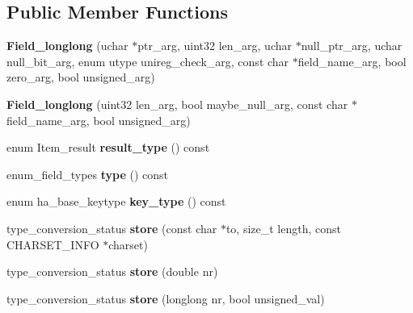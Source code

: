 \subsection*{Public Member Functions}
\begin{DoxyCompactItemize}
\item 
\mbox{\label{classField__longlong_a8f50277e28ab8d4a9904d38f58b73a9b}} 
{\bfseries Field\+\_\+longlong} (uchar $\ast$ptr\+\_\+arg, uint32 len\+\_\+arg, uchar $\ast$null\+\_\+ptr\+\_\+arg, uchar null\+\_\+bit\+\_\+arg, enum utype unireg\+\_\+check\+\_\+arg, const char $\ast$field\+\_\+name\+\_\+arg, bool zero\+\_\+arg, bool unsigned\+\_\+arg)
\item 
\mbox{\label{classField__longlong_a53178bd4230b8352350d18a0248507d1}} 
{\bfseries Field\+\_\+longlong} (uint32 len\+\_\+arg, bool maybe\+\_\+null\+\_\+arg, const char $\ast$field\+\_\+name\+\_\+arg, bool unsigned\+\_\+arg)
\item 
\mbox{\label{classField__longlong_a02c150676f3be65be0c182b44f6be613}} 
enum Item\+\_\+result {\bfseries result\+\_\+type} () const
\item 
\mbox{\label{classField__longlong_a477cabb9fe8f73f6f8c8652f77537a12}} 
enum\+\_\+field\+\_\+types {\bfseries type} () const
\item 
\mbox{\label{classField__longlong_a9ad8fac6638867a6aff36b8ac7ba2e8c}} 
enum ha\+\_\+base\+\_\+keytype {\bfseries key\+\_\+type} () const
\item 
\mbox{\label{classField__longlong_a2ea084125a13c556afc6520017485ba1}} 
type\+\_\+conversion\+\_\+status {\bfseries store} (const char $\ast$to, size\+\_\+t length, const C\+H\+A\+R\+S\+E\+T\+\_\+\+I\+N\+FO $\ast$charset)
\item 
\mbox{\label{classField__longlong_a5d0c2ce7882a49d879ab0c15e55e4909}} 
type\+\_\+conversion\+\_\+status {\bfseries store} (double nr)
\item 
\mbox{\label{classField__longlong_a4976e6383f02f28255ca3bd120398aa9}} 
type\+\_\+conversion\+\_\+status {\bfseries store} (longlong nr, bool unsigned\+\_\+val)

\end{DoxyCompactItemize}
